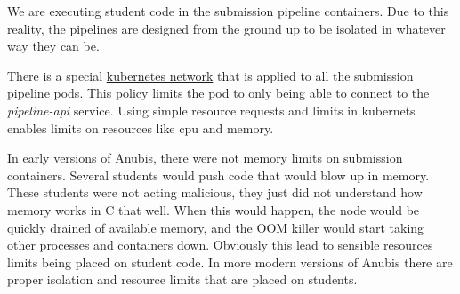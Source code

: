 We are executing student code in the submission pipeline containers.
Due to this reality, the pipelines are designed from the ground
up to be isolated in whatever way they can be.

There is a special \href{https://kubernetes.io/docs/concepts/services-networking/network-policies/}{kubernetes network} that is applied to 
all the submission pipeline pods.
This policy limits the pod to only being able to connect to the \textit{pipeline-api}
service.
Using simple resource requests and limits in kubernets enables
limits on resources like cpu and memory.

In early versions of Anubis, there were not memory limits on submission
containers. 
Several students would push code that would blow up in memory. 
These students were not acting malicious, they just did not understand
how memory works in C that well.
When this would happen, the node would be quickly drained of available memory,
and the OOM killer would start taking other processes and containers down.
Obviously this lead to sensible resources limits being placed
on student code. In more modern versions of Anubis there are proper isolation and
resource limits that are placed on students.



